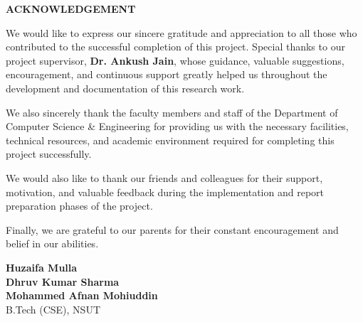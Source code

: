 \begin{center}
    \large
    \textbf{ACKNOWLEDGEMENT}
\end{center}

\vspace{1cm}

We would like to express our sincere gratitude and appreciation to all those who contributed to the successful completion of this project. Special thanks to our project supervisor, \textbf{Dr. Ankush Jain}, whose guidance, valuable suggestions, encouragement, and continuous support greatly helped us throughout the development and documentation of this research work.

We also sincerely thank the faculty members and staff of the Department of Computer Science \& Engineering for providing us with the necessary facilities, technical resources, and academic environment required for completing this project successfully.

We would also like to thank our friends and colleagues for their support, motivation, and valuable feedback during the implementation and report preparation phases of the project.

Finally, we are grateful to our parents for their constant encouragement and belief in our abilities.

\vspace{2cm}

\begin{flushright}
    \textbf{Huzaifa Mulla}\\
    \textbf{Dhruv Kumar Sharma}\\
    \textbf{Mohammed Afnan Mohiuddin}\\
    B.Tech (CSE), NSUT
\end{flushright}
